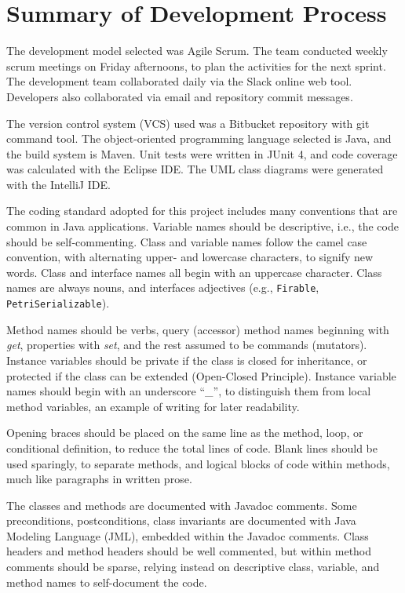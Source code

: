 
\section{Summary of Development Process}

The development model selected was Agile Scrum. The team conducted weekly
scrum meetings on Friday afternoons, to plan the activities for the next sprint.
The development team collaborated daily via the Slack online web tool. Developers
also collaborated via email and repository commit messages.

The version control system (VCS) used was a Bitbucket repository with git command tool.
The object-oriented programming language selected is Java, and the build system is Maven.
Unit tests were written in JUnit 4, and code coverage was calculated with the Eclipse IDE.
The UML class diagrams were generated with the IntelliJ IDE.

The coding standard adopted for this project includes many conventions that are common
in Java applications. Variable names should be descriptive, i.e., the code should be self-commenting.
Class and variable names follow the camel case convention, with alternating upper-
and lowercase characters, to signify new words. Class and interface names all
begin with an uppercase character. Class names are always nouns, and interfaces
adjectives (e.g., \texttt{Firable}, \texttt{PetriSerializable}).

Method names should be verbs, query (accessor) method names beginning with \textit{get}, properties
with \textit{set}, and the rest assumed to be commands (mutators). Instance variables should be private
if the class is closed for inheritance, or protected if the class can be extended (Open-Closed Principle).
Instance variable names should begin with an underscore ``\_'', to distinguish them from local
method variables, an example of writing for later readability.

Opening braces should be placed on the same line as the method, loop, or conditional definition, to
reduce the total lines of code. Blank lines should be used sparingly, to separate methods, and
logical blocks of code within methods, much like paragraphs in written prose.

The classes and methods are documented with Javadoc comments. Some preconditions,
postconditions, class invariants are documented with Java Modeling Language (JML),
embedded within the Javadoc comments. Class headers and method headers should be well commented,
but within method comments should be sparse, relying instead on descriptive class, variable, and
method names to self-document the code.

